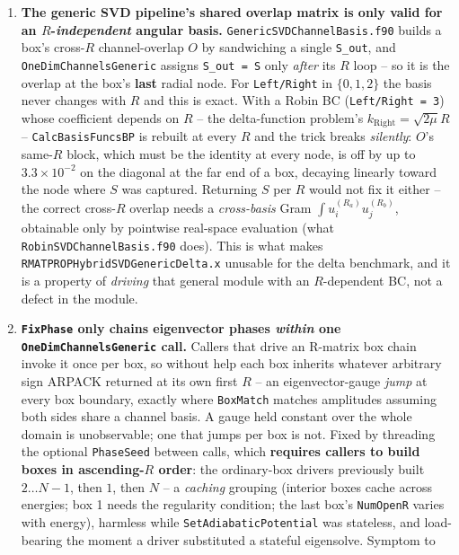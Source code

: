 \documentclass[11pt]{article}
\newcommand{\file}[1]{\texttt{#1}}
\newcommand{\sub}[1]{\texttt{#1}}
\begin{document}
\begin{enumerate}[leftmargin=*]
\item\label{got:sout} \textbf{The generic SVD pipeline's shared overlap matrix is only valid for an
  $R$-\emph{independent} angular basis.} \file{GenericSVDChannelBasis.f90} builds a box's cross-$R$
  channel-overlap $O$ by sandwiching a single \texttt{S\_out}, and \sub{OneDimChannelsGeneric}
  assigns \texttt{S\_out\,=\,S} only \emph{after} its $R$ loop -- so it is the overlap at the box's
  \textbf{last} radial node. For \texttt{Left/Right} in $\{0,1,2\}$ the basis never changes with $R$
  and this is exact. With a Robin BC (\texttt{Left/Right\,=\,3}) whose coefficient depends on $R$ --
  the delta-function problem's $k_{\mathrm{Right}}=\sqrt{2\mu}R$ -- \sub{CalcBasisFuncsBP} is
  rebuilt at every $R$ and the trick breaks \emph{silently}: $O$'s same-$R$ block, which must be the
  identity at every node, is off by up to $3.3\times10^{-2}$ on the diagonal at the far end of a box,
  decaying linearly toward the node where $S$ was captured. Returning $S$ per $R$ would not fix it
  either -- the correct cross-$R$ overlap needs a \emph{cross-basis} Gram
  $\int u_i^{(R_a)}u_j^{(R_b)}$, obtainable only by pointwise real-space evaluation (what
  \file{RobinSVDChannelBasis.f90} does). This is what makes \file{RMATPROPHybridSVDGenericDelta.x}
  unusable for the delta benchmark, and it is a property of \emph{driving} that general module with
  an $R$-dependent BC, not a defect in the module.
\item\label{got:phasechain} \textbf{\sub{FixPhase} only chains eigenvector phases \emph{within} one
  \sub{OneDimChannelsGeneric} call.} Callers that drive an R-matrix box chain invoke it once per box,
  so without help each box inherits whatever arbitrary sign ARPACK returned at its own first $R$ --
  an eigenvector-gauge \emph{jump} at every box boundary, exactly where \sub{BoxMatch} matches
  amplitudes assuming both sides share a channel basis. A gauge held constant over the whole domain
  is unobservable; one that jumps per box is not. Fixed by threading the optional \texttt{PhaseSeed}
  between calls, which \textbf{requires callers to build boxes in ascending-$R$ order}: the
  ordinary-box drivers previously built $2\ldots N{-}1$, then $1$, then $N$ -- a \emph{caching}
  grouping (interior boxes cache across energies; box 1 needs the regularity condition; the last
  box's \texttt{NumOpenR} varies with energy), harmless while \sub{SetAdiabaticPotential} was
  stateless, and load-bearing the moment a driver substituted a stateful eigensolve. Symptom to

\end{enumerate}
\end{document}
